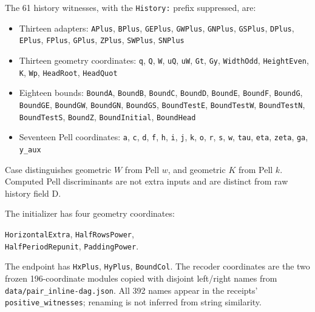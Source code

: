 \documentclass[11pt,letterpaper]{article}
\theoremstyle{definition}\newtheorem{definition}[theorem]{Definition}
\theoremstyle{remark}\newtheorem{remark}[theorem]{Remark}
\newcommand{\codeu}[1]{\nolinkurl{#1}}
\newcommand{\name}[1]{\mbox{\codeu{#1}}}
\begin{document}
The 61 history witnesses, with the \codeu{History:} prefix suppressed, are:
\begin{itemize}
\item Thirteen adapters: \name{APlus}, \name{BPlus}, \name{GEPlus}, \name{GWPlus}, \name{GNPlus}, \name{GSPlus}, \name{DPlus}, \name{EPlus}, \name{FPlus}, \name{GPlus}, \name{ZPlus}, \name{SWPlus}, \name{SNPlus}
\item Thirteen geometry coordinates: \name{q}, \name{Q}, \name{W}, \name{uQ}, \name{uW}, \name{Gt}, \name{Gy}, \name{WidthOdd}, \name{HeightEven}, \name{K}, \name{Wp}, \name{HeadRoot}, \name{HeadQuot}
\item Eighteen bounds: \name{BoundA}, \name{BoundB}, \name{BoundC}, \name{BoundD}, \name{BoundE}, \name{BoundF}, \name{BoundG}, \name{BoundGE}, \name{BoundGW}, \name{BoundGN}, \name{BoundGS}, \name{BoundTestE}, \name{BoundTestW}, \name{BoundTestN}, \name{BoundTestS}, \name{BoundZ}, \name{BoundInitial}, \name{BoundHead}
\item Seventeen Pell coordinates: \name{a}, \name{c}, \name{d}, \name{f}, \name{h}, \name{i}, \name{j}, \name{k}, \name{o}, \name{r}, \name{s}, \name{w}, \name{tau}, \name{eta}, \name{zeta}, \name{ga}, \name{y_aux}
\end{itemize}
Case distinguishes geometric $W$ from Pell $w$, and geometric $K$ from Pell $k$. Computed Pell discriminants are not extra inputs and are distinct from raw history field D.

The initializer has four geometry coordinates:
\begin{center}\name{HorizontalExtra}, \name{HalfRowsPower},\\
\name{HalfPeriodRepunit}, \name{PaddingPower}.\end{center} The endpoint has \name{HxPlus}, \name{HyPlus}, \name{BoundCol}. The recoder coordinates are the two frozen 196-coordinate modules copied with disjoint left/right names from \codeu{data/pair_inline-dag.json}. All 392 names appear in the receipts' \codeu{positive_witnesses}; renaming is not inferred from string similarity.
\end{document}
